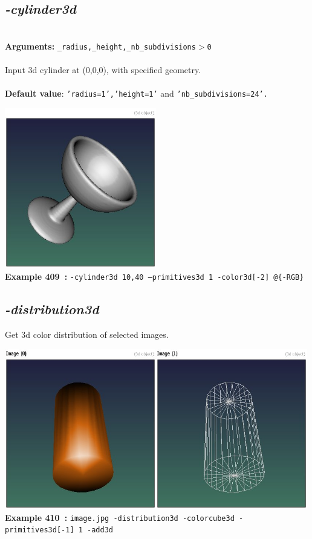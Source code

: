 \documentclass[a4paper,11pt,twoside]{book}
\begin{document}
\subsection{\emph{-cylinder3d} }\vspace*{-0.5em}
~\\\textbf{Arguments: } 
{\small \texttt{\_radius,\_height,\_nb\_subdivisions$>$0}}\\~\\
Input 3d cylinder at (0,0,0), with specified geometry.
~\\~\\\textbf{Default value}: {\small \texttt{'radius=1','height=1'} and \texttt{'nb\_subdivisions=24'.}}
\begin{center}\includegraphics[keepaspectratio=true,height=7cm,width=\textwidth]{img/gmic_def409.jpg}\\
{\footnotesize \textbf{Example 409~:} \texttt{-cylinder3d 10,40 --primitives3d 1 -color3d[-2] @\{-RGB\}}}
\end{center}

\subsection{\emph{-distribution3d} }\vspace*{-0.5em}
Get 3d color distribution of selected images.
\begin{center}\includegraphics[keepaspectratio=true,height=7cm,width=\textwidth]{img/gmic_def410.jpg}\\
{\footnotesize \textbf{Example 410~:} \texttt{image.jpg -distribution3d -colorcube3d -primitives3d[-1] 1 -add3d}}
\end{center}
\end{document}
